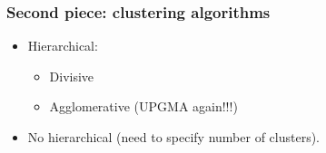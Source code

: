 
\begin{frame}
\frametitle{Second piece: clustering algorithms}
\begin{itemize}
\item Hierarchical:
\begin{itemize}
\item Divisive
\item Agglomerative (UPGMA again!!!)
\end{itemize}
\item No hierarchical (need to specify number of clusters).
\end{itemize}
\end{frame}











